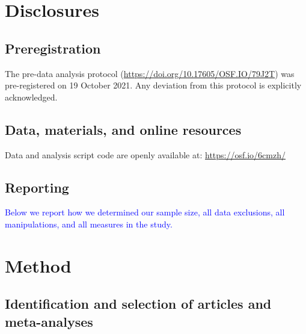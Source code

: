 \documentclass[
  ,man,floatsintext]{apa6}
\begin{document}
\hypertarget{disclosures}{%
\section{Disclosures}\label{disclosures}}

\hypertarget{preregistration}{%
\subsection{Preregistration}\label{preregistration}}

The pre-data analysis protocol (\url{https://doi.org/10.17605/OSF.IO/79J2T}) was pre-registered on 19 October 2021. Any deviation from this protocol is explicitly acknowledged.

\hypertarget{data-materials-and-online-resources}{%
\subsection{Data, materials, and online resources}\label{data-materials-and-online-resources}}

Data and analysis script code are openly available at: \url{https://osf.io/6cmzh/}

\hypertarget{reporting}{%
\subsection{Reporting}\label{reporting}}

\textcolor{blue}{Below we report how we determined our sample size, all data exclusions, all manipulations, and all measures in the study.}

\hypertarget{method}{%
\section{Method}\label{method}}

\hypertarget{identification-and-selection-of-articles-and-meta-analyses}{%
\subsection{Identification and selection of articles and meta-analyses}\label{identification-and-selection-of-articles-and-meta-analyses}}
\end{document}
